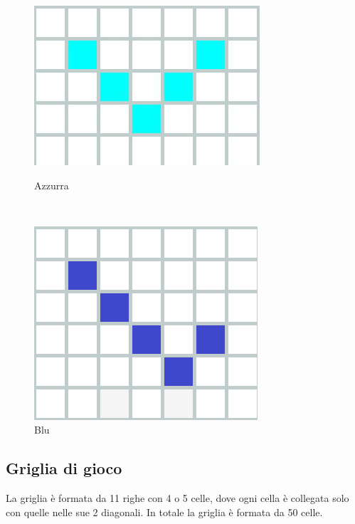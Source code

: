 \begin{figure}[h]
	\centering
	\begin{minipage}{3.5cm}
		\centering
		\includegraphics[scale=0.25]{immagini/v}
		\caption{Azzurra}
		\label{v}
	\end{minipage}
	\ \hspace{2mm} \hspace{3mm} \
	\begin{minipage}{3.5cm}
		\centering
		\includegraphics[scale=0.30]{immagini/L}
		\caption{Blu}
		\label{l}
	\end{minipage}
\end{figure}

\newpage
\subsection{Griglia di gioco}
La griglia è formata da 11 righe con 4 o 5 celle, dove ogni cella è collegata solo con quelle nelle sue 2 diagonali. In totale la griglia è formata da 50 celle.

